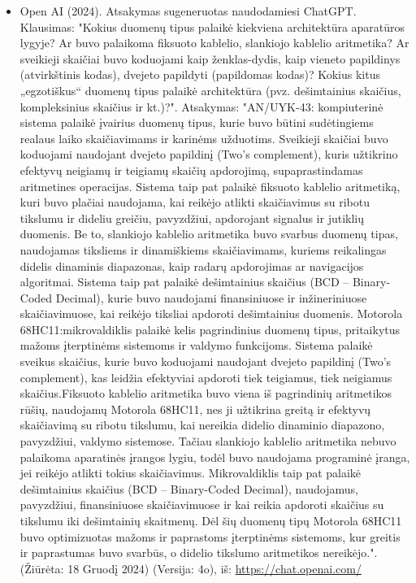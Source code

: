 \documentclass[a4paper,12pt]{article}
\begin{document}
\begin{itemize}
    \item Open AI (2024). Atsakymas sugeneruotas naudodamiesi ChatGPT. Klausimas: "Kokius duomenų tipus palaikė kiekviena architektūra aparatūros lygyje? Ar buvo palaikoma fiksuoto kablelio, slankiojo kablelio aritmetika? Ar sveikieji skaičiai buvo koduojami kaip ženklas-dydis, kaip vieneto papildinys (atvirkštinis kodas), dvejeto papildyti (papildomas kodas)? Kokius kitus „egzotiškus“ duomenų tipus palaikė architektūra (pvz. dešimtainius skaičius, kompleksinius skaičius ir kt.)?". Atsakymas: "AN/UYK-43: kompiuterinė sistema palaikė įvairius duomenų tipus, kurie buvo būtini sudėtingiems realaus laiko skaičiavimams ir karinėms užduotims. Sveikieji skaičiai buvo koduojami naudojant dvejeto papildinį (Two's complement), kuris užtikrino efektyvų neigiamų ir teigiamų skaičių apdorojimą, supaprastindamas aritmetines operacijas. Sistema taip pat palaikė fiksuoto kablelio aritmetiką, kuri buvo plačiai naudojama, kai reikėjo atlikti skaičiavimus su ribotu tikslumu ir dideliu greičiu, pavyzdžiui, apdorojant signalus ir jutiklių duomenis. Be to, slankiojo kablelio aritmetika buvo svarbus duomenų tipas, naudojamas tiksliems ir dinamiškiems skaičiavimams, kuriems reikalingas didelis dinaminis diapazonas, kaip radarų apdorojimas ar navigacijos algoritmai. Sistema taip pat palaikė dešimtainius skaičius (BCD – Binary-Coded Decimal), kurie buvo naudojami finansiniuose ir inžineriniuose skaičiavimuose, kai reikėjo tiksliai apdoroti dešimtainius duomenis. Motorola 68HC11:mikrovaldiklis palaikė kelis pagrindinius duomenų tipus, pritaikytus mažoms įterptinėms sistemoms ir valdymo funkcijoms. Sistema palaikė sveikus skaičius, kurie buvo koduojami naudojant dvejeto papildinį (Two’s complement), kas leidžia efektyviai apdoroti tiek teigiamus, tiek neigiamus skaičius.Fiksuoto kablelio aritmetika buvo viena iš pagrindinių aritmetikos rūšių, naudojamų Motorola 68HC11, nes ji užtikrina greitą ir efektyvų skaičiavimą su ribotu tikslumu, kai nereikia didelio dinaminio diapazono, pavyzdžiui, valdymo sistemose. Tačiau slankiojo kablelio aritmetika nebuvo palaikoma aparatinės įrangos lygiu, todėl buvo naudojama programinė įranga, jei reikėjo atlikti tokius skaičiavimus. Mikrovaldiklis taip pat palaikė dešimtainius skaičius (BCD – Binary-Coded Decimal), naudojamus, pavyzdžiui, finansiniuose skaičiavimuose ir kai reikia apdoroti skaičius su tikslumu iki dešimtainių skaitmenų. Dėl šių duomenų tipų Motorola 68HC11 buvo optimizuotas mažoms ir paprastoms įterptinėms sistemoms, kur greitis ir paprastumas buvo svarbūs, o didelio tikslumo aritmetikos nereikėjo.". (Žiūrėta: 18 Gruodį 2024) (Versija: 4o), iš: \url{https://chat.openai.com/}
\end{itemize}
\end{document}
